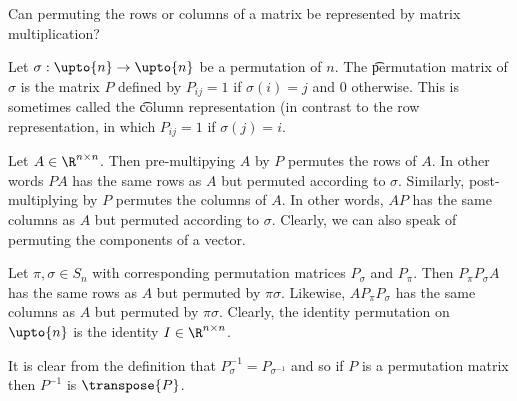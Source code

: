 

Can permuting the rows or columns of a matrix be represented by matrix multiplication?


Let $\sigma : \upto{n} \to \upto{n}$ be a permutation of $n$.
The \t{permutation matrix} of $\sigma $ is the matrix $P$ defined by $P_{ij} = 1$ if $\sigma (i) = j$ and 0 otherwise.
This is sometimes called the \t{column representation} (in contrast to the row representation, in which $P_{ij} = 1$ if $\sigma (j) = i$.

Let $A \in \R ^{n \times  n}$.
Then pre-multipying $A$ by $P$ permutes the rows of $A$.
In other words $PA$ has the same rows as $A$ but permuted according to $\sigma $.
Similarly, post-multiplying by $P$ permutes the columns of $A$.
In other words, $AP$ has the same columns as $A$ but permuted according to $\sigma $.
Clearly, we can also speak of permuting the components of a vector.


Let $\pi , \sigma  \in S_n$ with corresponding permutation matrices $P_\sigma $ and $P_\pi $.
Then $P_{\pi }P_{\sigma }A$ has the same rows as $A$ but permuted by $\pi \sigma $.
Likewise, $AP_{\pi }P_{\sigma }$ has the same columns as $A$ but permuted by $\pi \sigma $.
Clearly, the identity permutation on $\upto{n}$ is the identity $I \in \R ^{n \times  n}$.


It is clear from the definition that $P_{\sigma }^{-1} = P_{\sigma ^{-1}}$ and so if $P$ is a permutation matrix then $P^{-1}$ is $\transpose{P}$.

\blankpage

